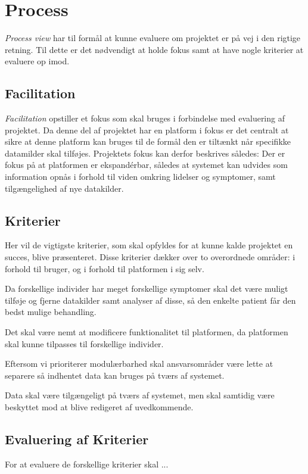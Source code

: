 \section{Process}\label{sec:process}
\emph{Process view} har til formål at kunne evaluere om projektet er på vej i den rigtige retning. 
Til dette er det nødvendigt at holde fokus samt at have nogle kriterier at evaluere op imod.

\subsection{Facilitation}
\emph{Facilitation} opstiller et fokus som skal bruges i forbindelse med evaluering af projektet.
Da denne del af projektet har en platform i fokus er det centralt at sikre at denne platform kan bruges til de formål den er tiltænkt når specifikke datamilder skal tilføjes.
Projektets fokus kan derfor beskrives således:
Der er fokus på at platformen er ekspandérbar, således at systemet kan udvides som information opnås i forhold til viden omkring lidelser og symptomer, samt tilgængelighed af nye datakilder.

\subsection{Kriterier}
Her vil de vigtigste kriterier, som skal opfyldes for at kunne kalde projektet en succes, blive præsenteret.
Disse kriterier dækker over to overordnede områder: i forhold til bruger, og i forhold til platformen i sig selv.

\begin{description}[style=nextline]
	\item[Modulær] 
	Da forskellige individer har meget forskellige symptomer skal det være muligt tilføje og fjerne datakilder samt analyser af disse, så den enkelte patient får den bedst mulige behandling.
	\item[Fleksibilitet]
	Det skal være nemt at modificere funktionalitet til platformen, da platformen skal kunne tilpasses til forskellige individer.
	\item[Kombinerbar] Eftersom vi prioriterer modulærbarhed skal ansvarsområder være lette at separere så indhentet data kan bruges på tværs af systemet.
	\item[Kommunikation] Data skal være tilgængeligt på tværs af systemet, men skal samtidig være beskyttet mod at blive redigeret af uvedkommende.
\end{description}

\subsection{Evaluering af Kriterier}
For at evaluere de forskellige kriterier skal ...


